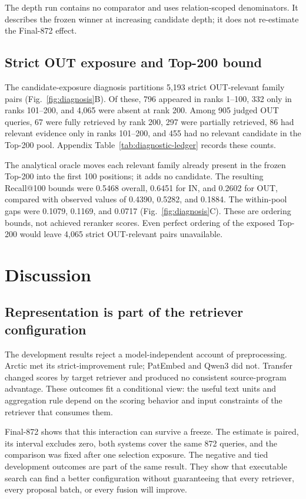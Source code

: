 \documentclass[final,5p,times,twocolumn]{elsarticle}
\begin{document}
The depth run contains no comparator and uses relation-scoped denominators. It describes
the frozen winner at increasing candidate depth; it does not re-estimate the
Final-872 effect.

\subsection{Strict OUT exposure and Top-200 bound}

The candidate-exposure diagnosis partitions 5,193 strict OUT-relevant family pairs
(Fig.~\ref{fig:diagnosis}B). Of these, 796 appeared in ranks 1--100, 332 only
in ranks 101--200, and 4,065 were absent at rank 200. Among 905 judged OUT
queries, 67 were fully retrieved by rank 200, 297 were partially retrieved,
86 had relevant evidence only in ranks 101--200, and 455 had no relevant
candidate in the Top-200 pool. Appendix Table~\ref{tab:diagnostic-ledger}
records these counts.

The analytical oracle moves each relevant family already present in the
frozen Top-200 into the first 100 positions; it adds no candidate. The
resulting Recall@100 bounds were 0.5468 overall, 0.6451 for IN, and 0.2602 for
OUT, compared with observed values of 0.4390, 0.5282, and 0.1884. The
within-pool gaps were 0.1079, 0.1169, and 0.0717
(Fig.~\ref{fig:diagnosis}C). These are ordering bounds, not achieved reranker
scores. Even perfect ordering of the exposed Top-200 would leave 4,065 strict
OUT-relevant pairs unavailable.

\section{Discussion}

\subsection{Representation is part of the retriever configuration}

The development results reject a model-independent account of preprocessing.
Arctic met its strict-improvement rule; PatEmbed and Qwen3 did not. Transfer
changed scores by target retriever and produced no consistent source-program
advantage. These outcomes fit a conditional view: the useful text units and
aggregation rule depend on the scoring behavior and input constraints of the
retriever that consumes them.

Final-872 shows that this interaction can survive a freeze. The estimate is
paired, its interval excludes zero, both systems cover the same 872 queries,
and the comparison was fixed after one selection exposure. The negative and
tied development outcomes are part of the same result. They show that
executable search can find a better configuration without guaranteeing that
every retriever, every proposal batch, or every fusion will improve.
\end{document}
